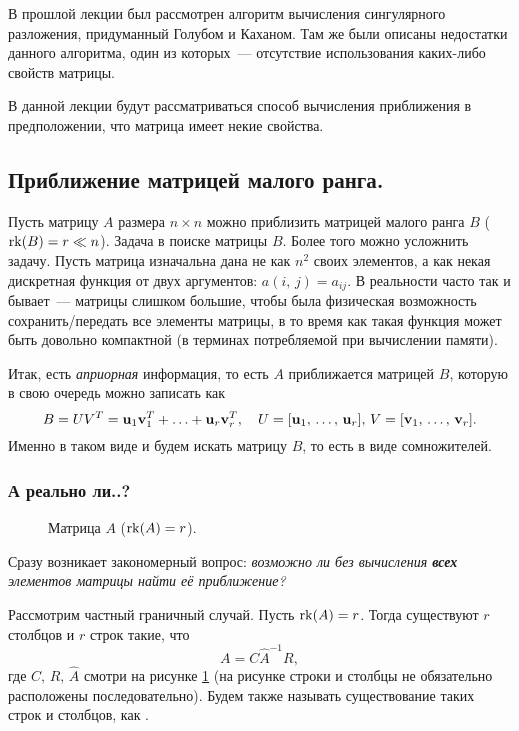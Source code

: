 \newpage
{}

В прошлой лекции был рассмотрен алгоритм вычисления сингулярного разложения, придуманный Голубом и Каханом.
Там же были описаны недостатки данного алгоритма, один из которых~--- отсутствие использования каких-либо свойств матрицы.

В данной лекции будут рассматриваться способ вычисления приближения в предположении, что матрица имеет некие свойства.

\subsection{Приближение матрицей малого ранга.}

Пусть матрицу $A$ размера $n\times n$ можно приблизить матрицей малого ранга $B$ ($\operatorname{rk}(B) = r \ll n$). Задача в поиске матрицы $B$.
Более того можно усложнить задачу. Пусть матрица изначальна дана не как $n^2$ своих элементов, а как некая дискретная функция от
двух аргументов: $a(i,\, j) = a_{ij}$. В реальности часто так и бывает~--- матрицы слишком большие, чтобы была физическая возможность
сохранить/передать все элементы матрицы, в то время как такая функция может быть довольно компактной (в терминах потребляемой при
вычислении памяти).

Итак, есть \textit{априорная} информация, то есть $A$ приближается матрицей $B$, которую в свою очередь можно записать
как
\[
    B = UV^T=\mathbf{u}_1\mathbf{v}_1^T+\ldots+\mathbf{u}_r\mathbf{v}_r^T, \quad U = [\mathbf{u}_1,\,\ldots,\, \mathbf{u}_r],\,
    V = [\mathbf{v}_1,\,\ldots,\, \mathbf{v}_r].
\]
Именно в таком виде и будем искать матрицу $B$, то есть в виде сомножителей.

\subsubsection{А реально ли..?}

\begin{wrapfigure}{r}{0.35\textwidth}
    \centering
    
    \caption{Матрица $A$ ($\operatorname{rk}(A)=r$).}
    \label{fig:lect05_matrix}
\end{wrapfigure}

Сразу возникает закономерный вопрос: \textit{возможно ли без вычисления \textbf{всех} элементов матрицы найти её приближение?}

Рассмотрим частный граничный случай. Пусть $\operatorname{rk}(A)=r$. Тогда существуют $r$ столбцов и $r$ строк такие, что
\[
    A = C \widehat{A}^{-1}R,
\]
где $C,\, R,\, \widehat{A}$ смотри на рисунке \ref{fig:lect05_matrix} (на рисунке строки и столбцы не обязательно расположены
последовательно). Будем также называть существование таких строк и столбцов, как .


